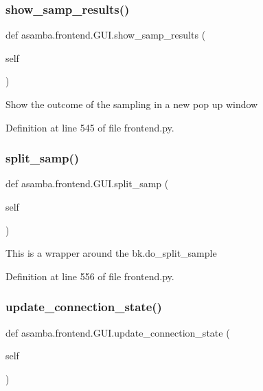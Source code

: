 \subsubsection{\texorpdfstring{show\+\_\+samp\+\_\+results()}{show\_samp\_results()}}
{\footnotesize\ttfamily def asamba.\+frontend.\+G\+U\+I.\+show\+\_\+samp\+\_\+results (\begin{DoxyParamCaption}\item[{}]{self }\end{DoxyParamCaption})}

\begin{DoxyVerb}Show the outcome of the sampling in a new pop up window \end{DoxyVerb}
 

Definition at line 545 of file frontend.\+py.

\mbox{\label{classasamba_1_1frontend_1_1_g_u_i_a284b5146fbb37994b46e34ce48475f65}} 
\subsubsection{\texorpdfstring{split\+\_\+samp()}{split\_samp()}}
{\footnotesize\ttfamily def asamba.\+frontend.\+G\+U\+I.\+split\+\_\+samp (\begin{DoxyParamCaption}\item[{}]{self }\end{DoxyParamCaption})}

\begin{DoxyVerb}This is a wrapper around the bk.do_split_sample \end{DoxyVerb}
 

Definition at line 556 of file frontend.\+py.

\mbox{\label{classasamba_1_1frontend_1_1_g_u_i_a905cc040d83a85cd64003f98b859a64a}} 
\subsubsection{\texorpdfstring{update\+\_\+connection\+\_\+state()}{update\_connection\_state()}}
{\footnotesize\ttfamily def asamba.\+frontend.\+G\+U\+I.\+update\+\_\+connection\+\_\+state (\begin{DoxyParamCaption}\item[{}]{self }\end{DoxyParamCaption})}

